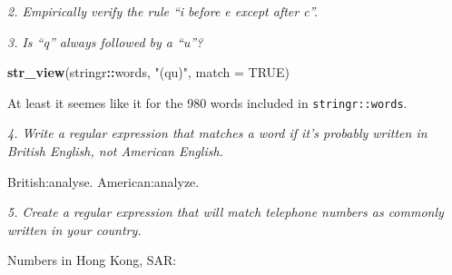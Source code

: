 \documentclass[]{article}
\newenvironment{Shaded}{\begin{snugshade}}{\end{snugshade}}
\newcommand{\KeywordTok}[1]{\textcolor[rgb]{0.13,0.29,0.53}{\textbf{#1}}}
\newcommand{\DataTypeTok}[1]{\textcolor[rgb]{0.13,0.29,0.53}{#1}}
\newcommand{\CharTok}[1]{\textcolor[rgb]{0.31,0.60,0.02}{#1}}
\newcommand{\StringTok}[1]{\textcolor[rgb]{0.31,0.60,0.02}{#1}}
\newcommand{\OtherTok}[1]{\textcolor[rgb]{0.56,0.35,0.01}{#1}}
\newcommand{\OperatorTok}[1]{\textcolor[rgb]{0.81,0.36,0.00}{\textbf{#1}}}
\newcommand{\NormalTok}[1]{#1}
\theoremstyle{definition}
\theoremstyle{definition}
\theoremstyle{definition}
\theoremstyle{remark}
\begin{document}
\hypertarget{htmlwidget-e815182aec449f0d035d}{}

\emph{2. Empirically verify the rule ``i before e except after c''.}

\emph{3. Is ``q'' always followed by a ``u''?}

\begin{Shaded}
\begin{Highlighting}[]
\KeywordTok{str_view}\NormalTok{(stringr}\OperatorTok{::}\NormalTok{words, }\StringTok{"(qu)"}\NormalTok{, }\DataTypeTok{match =} \OtherTok{TRUE}\NormalTok{)}
\end{Highlighting}
\end{Shaded}

\hypertarget{htmlwidget-48511de00c10d9853dc4}{}

At least it seemes like it for the 980 words included in
\texttt{stringr::words}.

\emph{4. Write a regular expression that matches a word if it's probably
written in British English, not American English.}

British:analyse. American:analyze.

\begin{Shaded}
\end{Shaded}

\hypertarget{htmlwidget-ca821a5d1c3558a455d4}{}

\emph{5. Create a regular expression that will match telephone numbers
as commonly written in your country.}

Numbers in Hong Kong, SAR:

\begin{Shaded}
\end{Shaded}
\end{document}
